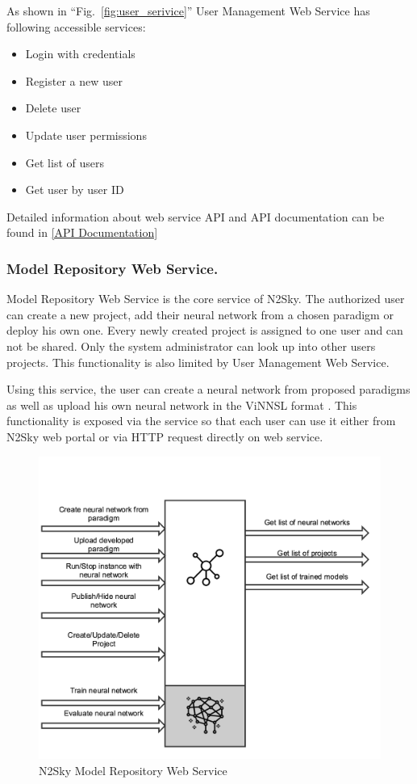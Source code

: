 As shown in ``Fig.~\ref{fig:user_serivice}'' User Management Web Service has following accessible services:

\begin{itemize}
\item Login with credentials
\item Register a new user 
\item Delete user
\item Update user permissions
\item Get list of users
\item Get user by user ID
\end{itemize}
 
Detailed information about web service API and API documentation can be found in \autoref{API Documentation}

\subsubsection{Model Repository Web Service.}\label{Model Repository Web Service}  Model Repository Web Service is the core service of N2Sky. The authorized user can create a new project, add their neural network from a chosen paradigm or deploy his own one. Every newly created project is assigned to one user and can not be shared. Only the system administrator can look up into other users projects. This functionality is also limited by User Management Web Service. 

Using this service, the user can create a neural network from proposed paradigms as well as upload his own neural network in the ViNNSL format \cite{Beran2008}. This functionality is exposed via the service so that each user can use it either from N2Sky web portal or via HTTP request directly on web service.

\begin{figure}[H]
\begin{center}
  \includegraphics[width=\linewidth]{components/3/components/model_serivce.png}
  \caption{N2Sky Model Repository Web Service}
  \label{fig:model_serivce}
\end{center}
\end{figure}

